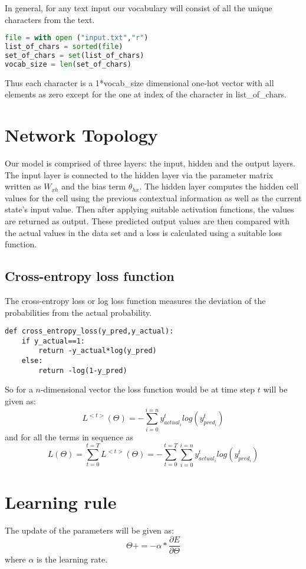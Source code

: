 \documentclass[12pt,letterpaper]{article}
\begin{document}
In general, for any text input our vocabulary will consist of all the unique characters from the text.
\begin{lstlisting}[language = Python]
file = with open ("input.txt","r")
list_of_chars = sorted(file)
set_of_chars = set(list_of_chars)
vocab_size = len(set_of_chars)
\end{lstlisting}

Thus each character is a 1*vocab\_size dimensional one-hot vector with all elements as zero except for the one at index of the character in list\_of\_chars.

\section{Network Topology}
Our model is comprised of three layers: the input, hidden and the output layers.
The input layer is connected to the hidden layer via the parameter matrix written as $W_{xh}$ and the bias term $\theta_{hx}$.
The hidden layer computes the hidden cell values for the cell using the previous contextual information as well as the current state's input value. 
Then after applying suitable activation functions, the values are returned as output. 
These predicted output values are then compared with the actual values in the data set and a loss is calculated using a suitable loss function.
\subsection{Cross-entropy loss function}
The cross-entropy loss or log loss function measures the deviation of the probabilities from the actual probability.
\begin{lstlisting}
def cross_entropy_loss(y_pred,y_actual):
    if y_actual==1:
        return -y_actual*log(y_pred)
    else:
        return -log(1-y_pred)
\end{lstlisting}
So for a $n$-dimensional vector the loss function would be at time step $t$ will be given as:
\[
L^{<t>}(\Theta) = - \sum_{i = 0}^{i=n}y^{t}_{actual_{i}}log(y^{t}_{pred_{i}}) \tag{1}
\]
and for all the terms in sequence as
\[
L(\Theta) = \sum_{t=0}^{t=T}L^{<t>}(\Theta)=- \sum_{t=0}^{t=T}\sum_{i = 0}^{i=n}y^{t}_{actual_{i}}log(y^{t}_{pred_{i}})\tag{2}
\]
\section{Learning rule}
The update of the parameters will be given as:
\[
\Theta +=  -\alpha*\frac{\partial{E}}{\partial{\Theta}}
\]
where $\alpha$ is the learning rate.
\end{document}
